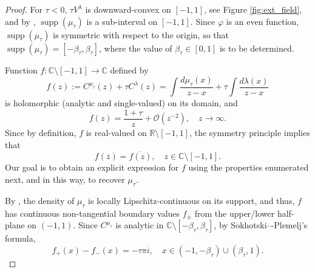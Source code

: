 \documentclass[reqno,11pt]{amsart}
\theoremstyle{plain}
\theoremstyle{definition}
\theoremstyle{remark}
\numberwithin{equation}{section}
\DeclareMathOperator{\supp}{supp}
\newcommand{\C}{\mathbb{C}}
\newcommand{\R}{\mathbb{R}}
\begin{document}
\begin{proof}
    For $\tau<0$, $\tau V^\lambda$ is downward-convex on $[-1,1]$, see Figure \ref{fig:ext_field}, and by \cite[Theorem IV.1.10, (b)]{Saff:97},  $\supp(\mu_\tau)$ is a sub-interval on $[-1,1]$. Since $\varphi$ is an even function, $\supp(\mu_\tau)$ is symmetric with respect to the origin, so that $\supp(\mu_\tau)=[-\beta_\tau,\beta_\tau]$, where the value of $\beta_\tau\in[0,1]$ is to be determined. 
    
    Function $f:\mathbb{C}\setminus[-1,1]\to\mathbb{C}$ defined by 
    $$
    f(z):=C^{\mu_\tau}(z)+\tau C^\lambda(z)=\int\frac{ d{\mu_\tau}(x)}{z-x}+ \tau \int\frac{ d{\lambda}(x)}{z-x}
    $$
    is holomorphic (analytic and single-valued) on its domain, and   
\begin{equation}\label{f_tau<-1_infinity_property}
        f(z)=\frac{1+\tau}{z}+\mathcal O(z^{-2}), \quad z\to\infty.
    \end{equation}
Since by definition, $f$ is real-valued on $\R\setminus [-1,1]$, the symmetry principle implies that
\begin{equation}
    \label{symmetryprinciple}
    f(\overline{z}) =\overline{f(z)}, \quad z\in \C\setminus [-1,1].
\end{equation}
Our goal is to obtain an explicit expression for $f$ using the properties enumerated next, and in this way, to recover $\mu_\tau$. 
    
By \cite[Chapter IV, in particular, Theorems IV.2.2 and IV.3.1]{Saff:97}, the density of $\mu_\tau$ is locally Lipschitz-continuous on its support, and thus, $f$ has continuous non-tangential boundary values $f_\pm$ from the upper/lower half-plane on $(-1,1)$. Since $C^{\mu_\tau}$ is analytic in $\C \setminus [-\beta_\tau,\beta_\tau]$, by Sokhotski–-Plemelj’s formula,   
    \begin{equation}
        f_+(x)-f_-(x)=-\tau\pi i,  \quad  x\in(-1,-\beta_\tau)\cup(\beta_\tau,1).
        \label{f_tau<-1_limit_subtract_property}
    \end{equation}
 

\end{proof}
\end{document}
